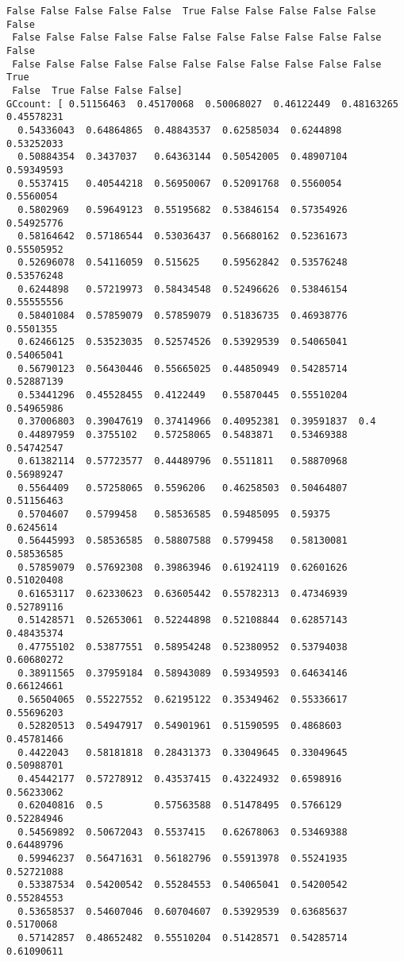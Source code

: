 \documentclass[11pt]{article}
\begin{document}
\begin{Verbatim}[commandchars=\\\{\}]
 False False False False False  True False False False False False False
 False False False False False False False False False False False False
 False False False False False False False False False False False  True
 False  True False False False]
GCcount: [ 0.51156463  0.45170068  0.50068027  0.46122449  0.48163265  0.45578231
  0.54336043  0.64864865  0.48843537  0.62585034  0.6244898   0.53252033
  0.50884354  0.3437037   0.64363144  0.50542005  0.48907104  0.59349593
  0.5537415   0.40544218  0.56950067  0.52091768  0.5560054   0.5560054
  0.5802969   0.59649123  0.55195682  0.53846154  0.57354926  0.54925776
  0.58164642  0.57186544  0.53036437  0.56680162  0.52361673  0.55505952
  0.52696078  0.54116059  0.515625    0.59562842  0.53576248  0.53576248
  0.6244898   0.57219973  0.58434548  0.52496626  0.53846154  0.55555556
  0.58401084  0.57859079  0.57859079  0.51836735  0.46938776  0.5501355
  0.62466125  0.53523035  0.52574526  0.53929539  0.54065041  0.54065041
  0.56790123  0.56430446  0.55665025  0.44850949  0.54285714  0.52887139
  0.53441296  0.45528455  0.4122449   0.55870445  0.55510204  0.54965986
  0.37006803  0.39047619  0.37414966  0.40952381  0.39591837  0.4
  0.44897959  0.3755102   0.57258065  0.5483871   0.53469388  0.54742547
  0.61382114  0.57723577  0.44489796  0.5511811   0.58870968  0.56989247
  0.5564409   0.57258065  0.5596206   0.46258503  0.50464807  0.51156463
  0.5704607   0.5799458   0.58536585  0.59485095  0.59375     0.6245614
  0.56445993  0.58536585  0.58807588  0.5799458   0.58130081  0.58536585
  0.57859079  0.57692308  0.39863946  0.61924119  0.62601626  0.51020408
  0.61653117  0.62330623  0.63605442  0.55782313  0.47346939  0.52789116
  0.51428571  0.52653061  0.52244898  0.52108844  0.62857143  0.48435374
  0.47755102  0.53877551  0.58954248  0.52380952  0.53794038  0.60680272
  0.38911565  0.37959184  0.58943089  0.59349593  0.64634146  0.66124661
  0.56504065  0.55227552  0.62195122  0.35349462  0.55336617  0.55696203
  0.52820513  0.54947917  0.54901961  0.51590595  0.4868603   0.45781466
  0.4422043   0.58181818  0.28431373  0.33049645  0.33049645  0.50988701
  0.45442177  0.57278912  0.43537415  0.43224932  0.6598916   0.56233062
  0.62040816  0.5         0.57563588  0.51478495  0.5766129   0.52284946
  0.54569892  0.50672043  0.5537415   0.62678063  0.53469388  0.64489796
  0.59946237  0.56471631  0.56182796  0.55913978  0.55241935  0.52721088
  0.53387534  0.54200542  0.55284553  0.54065041  0.54200542  0.55284553
  0.53658537  0.54607046  0.60704607  0.53929539  0.63685637  0.5170068
  0.57142857  0.48652482  0.55510204  0.51428571  0.54285714  0.61090611

\end{Verbatim}
\end{document}
